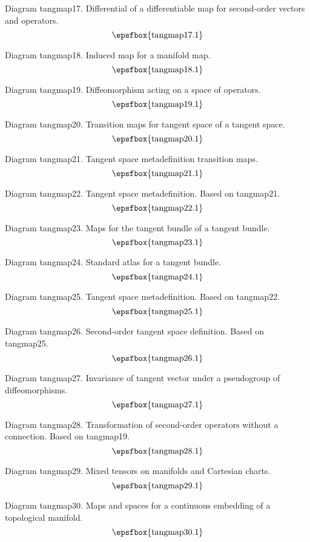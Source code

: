 \filleject

Diagram tangmap17. Differential of a differentiable map for second-order vectors
and operators.
$$
\centerline{\epsfbox{tangmap17.1}}
$$

Diagram tangmap18. Induced map for a manifold map.
$$
\centerline{\epsfbox{tangmap18.1}}
$$

Diagram tangmap19. Diffeomorphism acting on a space of operators.
$$
\centerline{\epsfbox{tangmap19.1}}
$$

Diagram tangmap20. Transition maps for tangent space of a tangent space.
$$
\centerline{\epsfbox{tangmap20.1}}
$$

\filleject

Diagram tangmap21. Tangent space metadefinition transition maps.
$$
\centerline{\epsfbox{tangmap21.1}}
$$

Diagram tangmap22. Tangent space metadefinition. Based on tangmap21.
$$
\centerline{\epsfbox{tangmap22.1}}
$$

Diagram tangmap23. Maps for the tangent bundle of a tangent bundle.
$$
\centerline{\epsfbox{tangmap23.1}}
$$

Diagram tangmap24. Standard atlas for a tangent bundle.
$$
\centerline{\epsfbox{tangmap24.1}}
$$

\filleject

Diagram tangmap25. Tangent space metadefinition. Based on tangmap22.
$$
\centerline{\epsfbox{tangmap25.1}}
$$

Diagram tangmap26. Second-order tangent space definition. Based on tangmap25.
$$
\centerline{\epsfbox{tangmap26.1}}
$$

Diagram tangmap27. Invariance of tangent vector under a pseudogroup of
diffeomorphisms.
$$
\centerline{\epsfbox{tangmap27.1}}
$$

Diagram tangmap28. Transformation of second-order operators without a
connection. Based on tangmap19.
$$
\centerline{\epsfbox{tangmap28.1}}
$$

\filleject

Diagram tangmap29. Mixed tensors on manifolds and Cartesian charts.
$$
\centerline{\epsfbox{tangmap29.1}}
$$

Diagram tangmap30. Maps and spaces for a continuous embedding of a topological
manifold.
$$
\centerline{\epsfbox{tangmap30.1}}
$$

